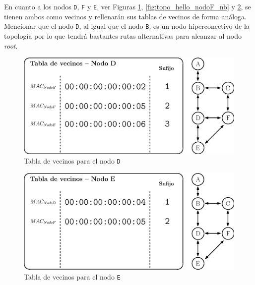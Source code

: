 En cuanto a los nodos \texttt{D}, \texttt{F} y \texttt{E}, ver Figuras \ref{fig:topo_hello_nodoD_nb}, \ref{fig:topo_hello_nodoF_nb} y \ref{fig:topo_hello_nodoE_nb}, se tienen ambos como vecinos y rellenarán sus tablas de vecinos de forma análoga. Mencionar que el nodo \texttt{D}, al igual que el nodo \texttt{B}, es un nodo hiperconectivo de la topología por lo que tendrá bastantes rutas alternativas para alcanzar al nodo \textit{root}.\\


\begin{figure}[ht!]
    \centering
    \includegraphics[width=\textwidth]{archivos/img/dev/topo_hello_nodoD_nb.eps}
    \caption{Tabla de vecinos para el nodo \texttt{D}}
    \label{fig:topo_hello_nodoD_nb}
\end{figure}


\begin{figure}[ht!]
    \centering
    \includegraphics[width=\textwidth]{archivos/img/dev/topo_hello_nodoE_nb.eps}
    \caption{Tabla de vecinos para el nodo \texttt{E}}
    \label{fig:topo_hello_nodoE_nb}
\end{figure}

\newpage



